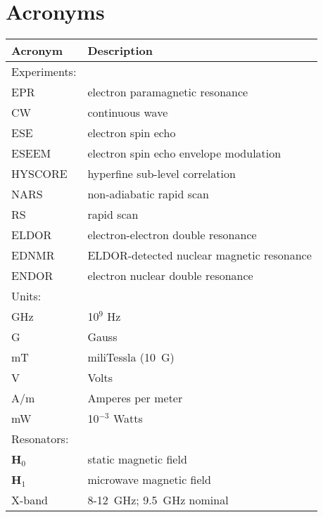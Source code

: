 \documentclass[11pt,a4paper,openany,twoside,english,titlepage=true]{scrbook}
\begin{document}
\listoffigures\newpage

\listoftables\newpage

\newpage
\chapter*{Acronyms}
\begin{table}[ht]
\vspace{-0.5em}
\begin{tabular}{ll}
\textbf{Acronym}     & \textbf{Description} \\ \hline \hline
\rowcolor{LightCyan}
Experiments:    & \\ \hline
EPR             & electron paramagnetic resonance \\
CW              & continuous wave \\
ESE             & electron spin echo \\
ESEEM           & electron spin echo envelope modulation \\
HYSCORE         & hyperfine sub-level correlation \\
NARS            & non-adiabatic rapid scan \\
RS              & rapid scan \\
ELDOR           & electron-electron double resonance \\
EDNMR           & ELDOR-detected nuclear magnetic resonance \\
ENDOR           & electron nuclear double resonance \\ \hline \hline
\rowcolor{LightCyan}
Units:          & \\ \hline
GHz             & 10$^9$ Hz \\
G               & Gauss \\
mT              & miliTessla (10~G) \\
V               & Volts \\
A/m             & Amperes per meter \\
mW              & 10$^{-3}$ Watts \\ \hline \hline
\rowcolor{LightCyan}
Resonators:     & \\ \hline
\textbf{H}$_0$  & static magnetic field \\
\textbf{H}$_1$  & microwave magnetic field \\
X-band          & 8-12~GHz; 9.5~GHz nominal \\ 

\end{tabular}
\end{table}
\end{document}
